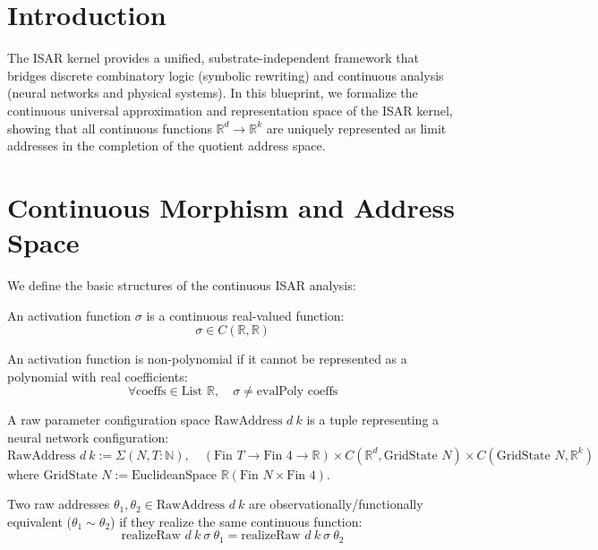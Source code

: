 \section{Introduction}
The ISAR kernel provides a unified, substrate-independent framework that bridges discrete combinatory logic (symbolic rewriting) and continuous analysis (neural networks and physical systems). In this blueprint, we formalize the continuous universal approximation and representation space of the ISAR kernel, showing that all continuous functions $\mathbb{R}^d \to \mathbb{R}^k$ are uniquely represented as limit addresses in the completion of the quotient address space.

\section{Continuous Morphism and Address Space}

We define the basic structures of the continuous ISAR analysis:

\begin{definition}[Activation]
An activation function $\sigma$ is a continuous real-valued function:
$$\sigma \in C(\mathbb{R}, \mathbb{R})$$
\end{definition}

\begin{definition}
An activation function is non-polynomial if it cannot be represented as a polynomial with real coefficients:
$$\forall \text{coeffs} \in \text{List } \mathbb{R}, \quad \sigma \neq \text{evalPoly coeffs}$$
\end{definition}

\begin{definition}[RawAddress]
A raw parameter configuration space $\text{RawAddress } d\ k$ is a tuple representing a neural network configuration:
$$\text{RawAddress } d\ k := \Sigma (N, T : \mathbb{N}), \quad (\text{Fin } T \to \text{Fin } 4 \to \mathbb{R}) \times C(\mathbb{R}^d, \text{GridState } N) \times C(\text{GridState } N, \mathbb{R}^k)$$
where $\text{GridState } N := \text{EuclideanSpace } \mathbb{R} (\text{Fin } N \times \text{Fin } 4)$.
\end{definition}

\begin{definition}[AddressEq]
Two raw addresses $\theta_1, \theta_2 \in \text{RawAddress } d\ k$ are observationally/functionally equivalent ($\theta_1 \sim \theta_2$) if they realize the same continuous function:
$$\text{realizeRaw } d\ k\ \sigma\ \theta_1 = \text{realizeRaw } d\ k\ \sigma\ \theta_2$$
\end{definition}

